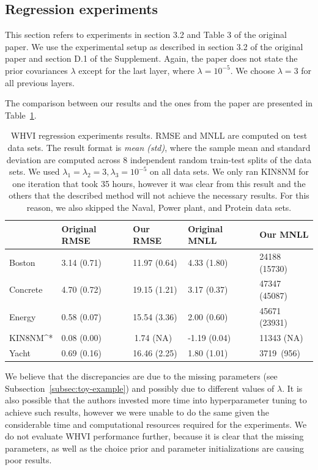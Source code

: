 \subsection{Regression experiments}\label{subsec:regression-experiments}
This section refers to experiments in section 3.2 and Table 3 of the original paper.
We use the experimental setup as described in section 3.2 of the original paper and section D.1 of the Supplement.
Again, the paper does not state the prior covariances $\lambda$ except for the last layer, where $\lambda = 10^{-5}$.
We choose $\lambda = 3$ for all previous layers.

The comparison between our results and the ones from the paper are presented in Table~\ref{tab:regression-experiments}.
\begin{table}[]
    \begin{tabular}{l|llll}
               & Original RMSE  & Our RMSE &  Original MNLL  & Our MNLL \\ \hline
    Boston     & 3.14 (0.71)     & 11.97 (0.64) & { }4.33 (1.80)     & 24188 (15730) \\
    Concrete   & 4.70 (0.72)     & 19.15 (1.21) & { }3.17 (0.37)     & 47347 (45087) \\
    Energy     & 0.58 (0.07)     & 15.54 (3.36) & { }2.00 (0.60)     & 45671 (23931) \\
    KIN8NM^*   & 0.08 (0.00)     & { }\,1.74 (NA) & -1.19 (0.04)       & 11343 (NA) \\
    Yacht      & 0.69 (0.16)     & 16.46 (2.25) & { }1.80 (1.01)     & 3719 { }\,(956)
    \end{tabular}
    \caption{
        WHVI regression experiments results.
        RMSE and MNLL are computed on test data sets.
        The result format is \textit{mean (std)}, where the sample mean and standard deviation are computed across 8 independent random train-test splits of the data sets.
        We used $\lambda_1=\lambda_2=3,\lambda_3=10^{-5}$ on all data sets.
        We only ran KIN8NM for one iteration that took 35 hours, however it was clear from this result and the others that the described method will not achieve the necessary results.
        For this reason, we also skipped the Naval, Power plant, and Protein data sets.
    }
    \label{tab:regression-experiments}
\end{table}

We believe that the discrepancies are due to the missing parameters (see Subsection~\ref{subsec:toy-example}) and possibly due to different values of $\lambda$.
It is also possible that the authors invested more time into hyperparameter tuning to achieve such results, however we were unable to do the same given the considerable time and computational resources required for the experiments.
We do not evaluate WHVI performance further, because it is clear that the missing parameters, as well as the choice prior and parameter initializations are causing poor results.
